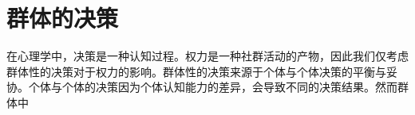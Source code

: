\documentclass[main.tex]{subfiles}
\begin{document}
\section{群体的决策}
在心理学中，决策是一种认知过程。权力是一种社群活动的产物，因此我们仅考虑群体性的决策对于权力的影响。群体性的决策来源于个体与个体决策的平衡与妥协。个体与个体的决策因为个体认知能力的差异，会导致不同的决策结果。然而群体中
\end{document}
